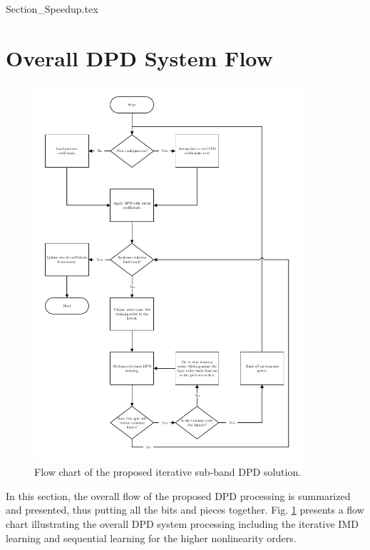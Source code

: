 {Section_Speedup.tex}

\section{Overall DPD System Flow}
\label{sec:SystemFlow}
\begin{figure}
	\centering
	\centerline{\includegraphics[width=0.89\textwidth]{./Figures/SubBandSystemNew.pdf}}
	\caption[]{Flow chart of the proposed iterative sub-band DPD solution.}
	\label{fig:SystemFlowChart}
\end{figure}
In this section, the overall flow of the proposed DPD processing is summarized and presented, thus putting all the bits and pieces together. 
Fig. \ref{fig:SystemFlowChart} presents a flow chart illustrating the overall DPD system processing including the iterative IMD learning and sequential learning for the higher nonlinearity orders.

